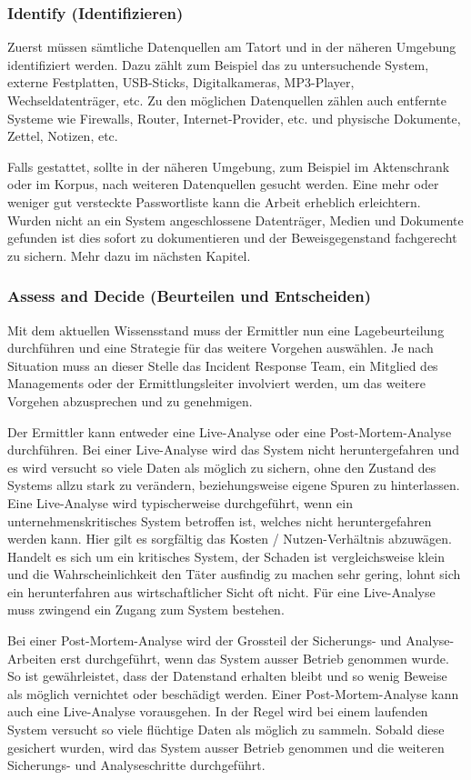 \subsubsection{Identify (Identifizieren)}
Zuerst müssen sämtliche Datenquellen am Tatort und in der näheren Umgebung identifiziert werden. Dazu zählt zum Beispiel das zu untersuchende System, externe Festplatten, USB-Sticks, Digitalkameras, MP3-Player, Wechseldatenträger, etc. Zu den möglichen Datenquellen zählen auch entfernte Systeme wie Firewalls, Router, Internet-Provider, etc. und physische Dokumente, Zettel, Notizen, etc. 

Falls gestattet, sollte in der näheren Umgebung, zum Beispiel im Aktenschrank oder im Korpus, nach weiteren Datenquellen gesucht werden. Eine mehr oder weniger gut versteckte Passwortliste kann die Arbeit erheblich erleichtern. Wurden nicht an ein System angeschlossene Datenträger, Medien  und Dokumente gefunden ist dies sofort zu dokumentieren und der Beweisgegenstand fachgerecht zu sichern. Mehr dazu im nächsten Kapitel.

\subsubsection{Assess and Decide (Beurteilen und Entscheiden)}
Mit dem aktuellen Wissensstand muss der Ermittler nun eine Lagebeurteilung durchführen und eine Strategie für das weitere Vorgehen auswählen. Je nach Situation muss an dieser Stelle das Incident Response Team, ein Mitglied des Managements oder der Ermittlungsleiter involviert werden, um das weitere Vorgehen abzusprechen und zu genehmigen.

Der Ermittler kann entweder eine Live-Analyse oder eine Post-Mortem-Analyse durchführen. Bei einer Live-Analyse wird das System nicht heruntergefahren und es wird versucht so viele Daten als möglich zu sichern, ohne den Zustand des Systems allzu stark zu verändern, beziehungsweise eigene Spuren zu hinterlassen. Eine Live-Analyse wird typischerweise durchgeführt, wenn ein unternehmenskritisches System betroffen ist, welches nicht heruntergefahren werden kann. Hier gilt es sorgfältig das Kosten / Nutzen-Verhältnis abzuwägen. Handelt es sich um ein kritisches System, der Schaden ist vergleichsweise klein und die Wahrscheinlichkeit den Täter ausfindig zu machen sehr gering, lohnt sich ein herunterfahren aus wirtschaftlicher Sicht oft nicht. Für eine Live-Analyse muss zwingend ein Zugang zum System bestehen.

Bei einer Post-Mortem-Analyse wird der Grossteil der Sicherungs- und Analyse-Arbeiten erst durchgeführt, wenn das System ausser Betrieb genommen wurde. So ist gewährleistet, dass der Datenstand erhalten bleibt und so wenig Beweise als möglich vernichtet oder beschädigt werden. Einer Post-Mortem-Analyse kann auch eine Live-Analyse vorausgehen. In der Regel wird bei einem laufenden System versucht so viele flüchtige Daten als möglich zu sammeln. Sobald diese gesichert wurden, wird das System ausser Betrieb genommen und die weiteren Sicherungs- und Analyseschritte durchgeführt.

